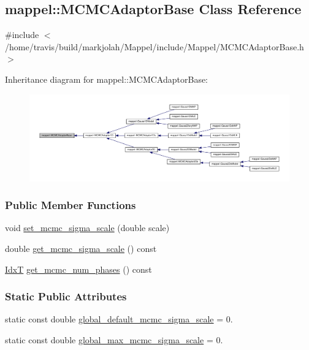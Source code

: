 \hypertarget{classmappel_1_1MCMCAdaptorBase}{}\subsection{mappel\+:\+:M\+C\+M\+C\+Adaptor\+Base Class Reference}
\label{classmappel_1_1MCMCAdaptorBase}


{\ttfamily \#include $<$/home/travis/build/markjolah/\+Mappel/include/\+Mappel/\+M\+C\+M\+C\+Adaptor\+Base.\+h$>$}



Inheritance diagram for mappel\+:\+:M\+C\+M\+C\+Adaptor\+Base\+:\nopagebreak
\begin{figure}[H]
\begin{center}
\leavevmode
\includegraphics[width=350pt]{classmappel_1_1MCMCAdaptorBase__inherit__graph}
\end{center}
\end{figure}
\subsubsection*{Public Member Functions}
\begin{DoxyCompactItemize}
\item 
void \hyperlink{classmappel_1_1MCMCAdaptorBase_aa6b8eea136bf1f34f0c50bf8d1937a58}{set\+\_\+mcmc\+\_\+sigma\+\_\+scale} (double scale)
\item 
double \hyperlink{classmappel_1_1MCMCAdaptorBase_a9de5ee52bbf5c8fd3c1e3bd00836801a}{get\+\_\+mcmc\+\_\+sigma\+\_\+scale} () const 
\item 
\hyperlink{namespacemappel_ab17ec0f30b61ece292439d7ece81d3a8}{IdxT} \hyperlink{classmappel_1_1MCMCAdaptorBase_adb9997f1dc774f3a169c61cdb730a85f}{get\+\_\+mcmc\+\_\+num\+\_\+phases} () const 
\end{DoxyCompactItemize}
\subsubsection*{Static Public Attributes}
\begin{DoxyCompactItemize}
\item 
static const double \hyperlink{classmappel_1_1MCMCAdaptorBase_a44cebca0e27135c854fa8430d2d89929}{global\+\_\+default\+\_\+mcmc\+\_\+sigma\+\_\+scale} = 0.
\item 
static const double \hyperlink{classmappel_1_1MCMCAdaptorBase_aebc93881ca351e67de867238a62579eb}{global\+\_\+max\+\_\+mcmc\+\_\+sigma\+\_\+scale} = 0.
\end{DoxyCompactItemize}
